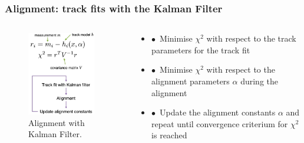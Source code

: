 \documentclass[aspectratio=1610, 12pt]{beamer}
\begin{document}
\begin{frame}\frametitle{Alignment: track fits with the Kalman Filter}
  \begin{columns}
    \begin{column}[c]{0.48\textwidth}
      \begin{figure}
        \centering
        \includegraphics[width=0.9\textwidth]{logos/kalman.png}
        \caption{Alignment with Kalman Filter.}
      \end{figure}
    \end{column}
    \begin{column}[c]{0.48\textwidth}
      \begin{itemize}
        \item $\bullet$\, Minimise $\chi^2$ with respect to the track parameters for the track fit
        \item $\bullet$\, Minimise $\chi^2$ with respect to the alignment parameters $\alpha$ during the alignment
        \item $\bullet$\, Update the alignment constants $\alpha$ and repeat until convergence criterium for $\chi^2$ is reached
      \end{itemize}
    \end{column}
  \end{columns}
\end{frame}
\end{document}
